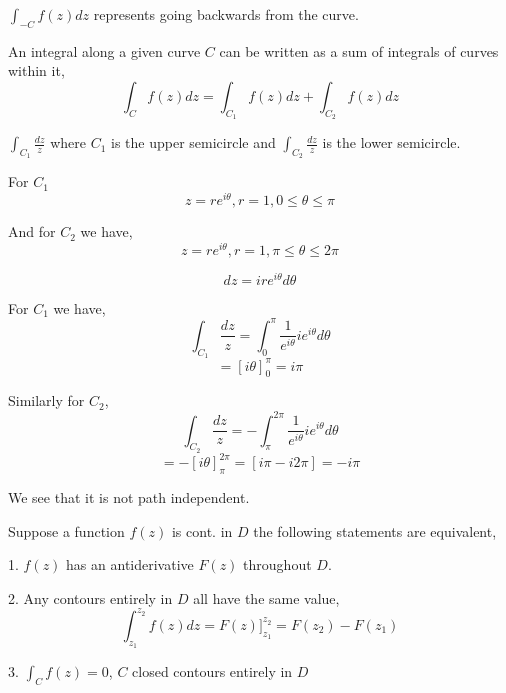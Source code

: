 $\int_{-C} f(z) dz$ represents going backwards from the curve.

An integral along a given curve $C$ can be written as a sum of integrals of curves within it, 
$$ \int_C f(z) dz = \int_{C_1}f(z) dz + \int_{C_2}f(z)dz $$ 

\begin{eg}
   $\int_{C_1} \frac{dz}{z}$  where $C_1$ is the upper semicircle and
   $\int_{C_2} \frac{dz}{z}$ is the lower semicircle.

\end{eg}
\begin{solution}
   For $C_1$
   $$z = re^{i\theta}, r = 1, 0 \le \theta \le \pi$$

   And for $C_2$ we have, 
   $$ z = re^{i\theta}, r = 1, \pi \le \theta \le 2\pi $$ 

   $$dz = ire^{i\theta}d\theta$$

   
   For $C_1$ we have, 
   $$ \int_{C_1} \frac{dz}{z} = \int_0^{\pi} \frac{1}{e^{i\theta}} i e ^{i\theta} d\theta $$ 
   $$= [i \theta]_0^{\pi} =  i\pi$$

   Similarly for $C_2$, 
$$ \int_{C_2} \frac{dz}{z} = - \int_\pi^{2\pi} \frac{1}{e^{i\theta}} i e ^{i\theta} d\theta $$ 
   $$= -[i \theta]_\pi^{2\pi} = [i\pi - i 2\pi] = -i\pi$$

   We see that it is not path independent.

\end{solution}


\begin{theorem}
   Suppose a function $f(z)$ is cont. in $D$ the following statements are equivalent,  

   1. $f(z)$ has an antiderivative $F(z)$ throughout $D$.

   2. Any contours entirely in $D$ all have the same value, 
   $$ \int_{z_1}^{z_2} f(z) dz = F(z)]_{z_1}^{z_2} = F(z_2) - F(z_1) $$ 

   3. $\int_C f(z) = 0$, $C$ closed contours entirely in $D$
\end{theorem}
